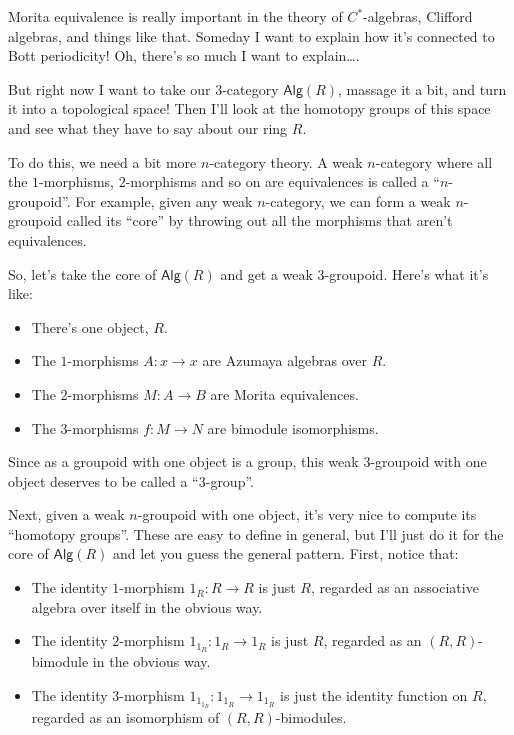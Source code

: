\documentclass{article}
\def\tightlist{}
\begin{document}
Morita equivalence is really important in the theory of
\(C^*\)-algebras, Clifford algebras, and things like that. Someday I
want to explain how it's connected to Bott periodicity! Oh, there's so
much I want to explain\ldots.

But right now I want to take our \(3\)-category \(\mathsf{Alg}(R)\),
massage it a bit, and turn it into a topological space! Then I'll look
at the homotopy groups of this space and see what they have to say about
our ring \(R\).

To do this, we need a bit more \(n\)-category theory. A weak
\(n\)-category where all the \(1\)-morphisms, \(2\)-morphisms and so on
are equivalences is called a ``\(n\)-groupoid''. For example, given any
weak \(n\)-category, we can form a weak \(n\)-groupoid called its
``core'' by throwing out all the morphisms that aren't equivalences.

So, let's take the core of \(\mathsf{Alg}(R)\) and get a weak
3-groupoid. Here's what it's like:

\begin{itemize}
\tightlist
\item
  There's one object, \(R\).
\item
  The \(1\)-morphisms \(A\colon x \to x\) are Azumaya algebras over
  \(R\).
\item
  The \(2\)-morphisms \(M\colon A \to B\) are Morita equivalences.
\item
  The \(3\)-morphisms \(f\colon M \to N\) are bimodule isomorphisms.
\end{itemize}

Since as a groupoid with one object is a group, this weak \(3\)-groupoid
with one object deserves to be called a ``\(3\)-group''.

Next, given a weak \(n\)-groupoid with one object, it's very nice to
compute its ``homotopy groups''. These are easy to define in general,
but I'll just do it for the core of \(\mathsf{Alg}(R)\) and let you
guess the general pattern. First, notice that:

\begin{itemize}
\tightlist
\item
  The identity \(1\)-morphism \(1_R\colon R \to R\) is just \(R\),
  regarded as an associative algebra over itself in the obvious way.
\item
  The identity \(2\)-morphism \(1_{1_R}\colon 1_R \to 1_R\) is just
  \(R\), regarded as an \((R,R)\)-bimodule in the obvious way.
\item
  The identity \(3\)-morphism \(1_{1_{1_R}}\colon 1_{1_R} \to 1_{1_R}\)
  is just the identity function on \(R\), regarded as an isomorphism of
  \((R,R)\)-bimodules.
\end{itemize}
\end{document}
